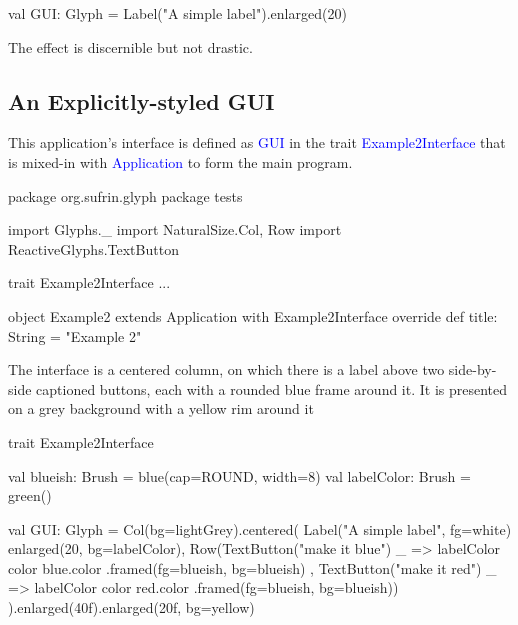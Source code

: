 \documentclass[12pt,a4paper]{article}
\def\Scala#1{\textcolor{blue}{\textsf{#1}}}
\def\SS#1{\subsection{#1}}
\begin{document}
\begin{scala}

val GUI: Glyph = Label("A simple label").enlarged(20)
\end{scala}

The effect is discernible but not drastic.

\begin{center}
\quad
{}
\end{center}

\SS{An Explicitly-styled GUI}

This application's interface is defined as \Scala{GUI} 
in the trait \Scala{Example2Interface} that is mixed-in with
\Scala{Application} to form the main program.

\begin{scala}
package org.sufrin.glyph
package tests

import Glyphs._
import NaturalSize.{Col, Row}
import ReactiveGlyphs.TextButton
\end{scala}

\begin{scala}
trait Example2Interface { ... }

object Example2 extends Application  with Example2Interface {
  override def title: String = "Example 2"
}
\end{scala}

\begin{center}
\end{center}

The interface is a centered column, on which there is
a label above two side-by-side captioned buttons, each with a
rounded blue frame around it. It is presented on a grey background with a
yellow rim around it

\begin{scala}
trait Example2Interface {
  val blueish:    Brush = blue(cap=ROUND, width=8)
  val labelColor: Brush = green()

  val GUI: Glyph = Col(bg=lightGrey).centered(
    Label("A simple label", fg=white) enlarged(20, bg=labelColor),
    Row(TextButton("make it blue") { _ => labelColor color blue.color }
        .framed(fg=blueish, bg=blueish)
       ,
        TextButton("make it red") { _ => labelColor color red.color }
        .framed(fg=blueish, bg=blueish))
  ).enlarged(40f).enlarged(20f, bg=yellow)

}
\end{scala}
\end{document}
